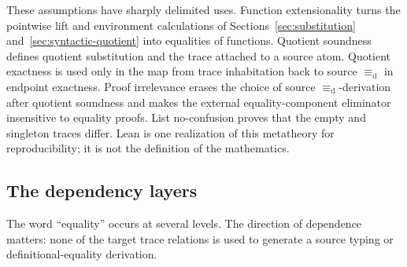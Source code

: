 \documentclass[10pt,reqno]{amsart}
\newcommand{\defeq}{\mathrel{\equiv_{\mathrm d}}}
\begin{document}
These assumptions have sharply delimited uses.  Function extensionality
turns the pointwise lift and environment calculations of
Sections~\ref{sec:substitution} and~\ref{sec:syntactic-quotient} into
equalities of functions.  Quotient soundness defines quotient substitution
and the trace attached to a source atom.  Quotient exactness is used only in
the map from trace inhabitation back to source \(\defeq\) in endpoint
exactness.  Proof irrelevance erases the
choice of source \(\defeq\)-derivation after quotient soundness and makes the
external equality-component eliminator insensitive to equality proofs.
List no-confusion proves that the empty and singleton traces differ.
Lean is one realization of this metatheory for reproducibility; it is not the
definition of the mathematics.

\subsection{The dependency layers}

The word ``equality'' occurs at several levels.  The direction of dependence
matters: none of the target trace relations is used to generate a source
typing or definitional-equality derivation.
\end{document}
